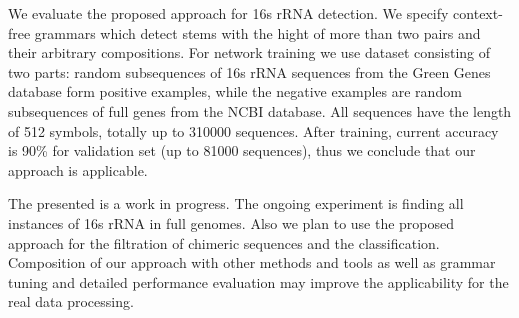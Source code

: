\documentclass[12pt]{article}  %
\theoremstyle{definition}
\theoremstyle{remark}
\begin{document}
We evaluate the proposed approach for 16s rRNA detection.
We specify context-free grammars which detect stems with the hight of more than two pairs and their arbitrary compositions.
For network training we use dataset consisting of two parts: random subsequences of 16s rRNA sequences from the Green Genes database form positive examples, while the negative examples are random subsequences of full genes from the NCBI database.%
All sequences have the length of 512 symbols, totally up to 310000 sequences.
After training, current accuracy is 90\% for validation set (up to 81000 sequences), thus we conclude that our approach is applicable.

The presented is a work in progress. 
The ongoing experiment is finding all instances of 16s rRNA in full genomes.
Also we plan to use the proposed approach for the filtration of chimeric sequences and the classification.
Composition of our approach with other methods and tools as well as grammar tuning and detailed performance evaluation may improve the applicability for the real data processing.
\end{document}
